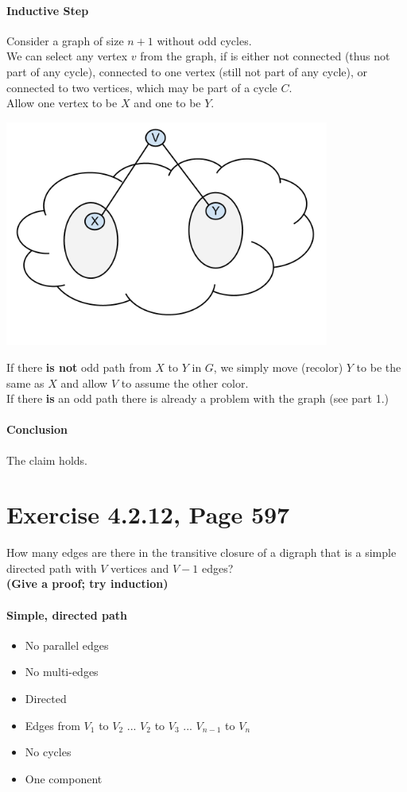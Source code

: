 \documentclass[12pt]{article}
\begin{document}
\paragraph{Inductive Step}
Consider a graph of size $n+1$ without odd cycles. \\
We can select any vertex $v$ from the graph, if is either not connected (thus not part of any cycle), connected to one vertex (still not part of any cycle), or connected to two vertices, which may be part of a cycle $C$. \\
Allow one vertex to be $X$ and one to be $Y$.
\begin{center}
\includegraphics[width=0.8\textwidth]{figures/bipartite.png}
\end{center}
If there {\bf is not} odd path from $X$ to $Y$ in $G$, we simply move (recolor) $Y$ to be the same as $X$ and allow $V$ to assume the other color. \\
If there {\bf is} an odd path there is already a problem with the graph (see part 1.)

\paragraph{Conclusion} The claim holds.


\section{Exercise 4.2.12, Page 597}
How many edges are there in the transitive closure of a digraph that is a simple directed path with $V$ vertices and $V-1$ edges? \\
{\bf (Give a proof; try induction)} \\
\paragraph{Simple, directed path}
\begin{itemize}
	\item No parallel edges
	\item No multi-edges
	\item Directed
	\item Edges from $V_1$ to $V_2$ ... $V_2$ to $V_3$ ... $V_{n-1}$ to $V_n$
	\item No cycles
	\item One component
\end{itemize}
\end{document}
